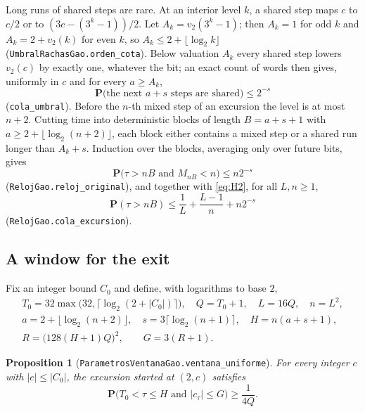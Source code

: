 \documentclass[11pt]{amsart}
\newtheorem{proposition}[theorem]{Proposition}
\theoremstyle{definition}
\theoremstyle{remark}
\newcommand{\Prob}{\mathbf{P}}
\newcommand{\lean}[1]{\nolinkurl{#1}}
\begin{document}
Long runs of shared steps are rare. At an interior level $k$, a shared step maps $c$ to $c/2$ or to $(3c-(3^k-1))/2$. Let $A_k=v_2(3^k-1)$; then $A_k=1$ for odd $k$ and $A_k=2+v_2(k)$ for even $k$, so $A_k\le 2+\lfloor\log_2 k\rfloor$ (\lean{UmbralRachasGao.orden_cota}). Below valuation $A_k$ every shared step lowers $v_2(c)$ by exactly one, whatever the bit; an exact count of words then gives, uniformly in $c$ and for every $a\ge A_k$,
\begin{equation}\label{eq:runs}
\Prob\bigl(\text{the next } a+s \text{ steps are shared}\bigr)\le 2^{-s}
\end{equation}
(\lean{cola_umbral}). Before the $n$-th mixed step of an excursion the level is at most $n+2$. Cutting time into deterministic blocks of length $B=a+s+1$ with $a\ge 2+\lfloor\log_2(n+2)\rfloor$, each block either contains a mixed step or a shared run longer than $A_k+s$. Induction over the blocks, averaging only over future bits, gives
\begin{equation}\label{eq:M6}
\Prob\bigl(\tau>nB \text{ and } M_{nB}<n\bigr)\le n2^{-s}
\end{equation}
(\lean{RelojGao.reloj_original}), and together with \eqref{eq:H2}, for all $L,n\ge1$,
\begin{equation}\label{eq:H3}
\Prob(\tau>nB)\le \frac1L+\frac{L-1}{n}+n2^{-s}
\end{equation}
(\lean{RelojGao.cola_excursion}).

\subsection{A window for the exit}
Fix an integer bound $C_0$ and define, with logarithms to base $2$,
\begin{gather*}
T_0=32\max\bigl(32,\lceil\log_2(2+|C_0|)\rceil\bigr),\quad Q=T_0+1,\quad L=16Q,\quad n=L^2,\\
a=2+\lfloor\log_2(n+2)\rfloor,\quad s=3\lceil\log_2(n+1)\rceil,\quad H=n(a+s+1),\\
R=\bigl(128(H+1)Q\bigr)^2,\qquad G=3(R+1).
\end{gather*}

\begin{proposition}[\lean{ParametrosVentanaGao.ventana_uniforme}]\label{prop:VH}
For every integer $c$ with $|c|\le|C_0|$, the excursion started at $(2,c)$ satisfies
\[
\Prob\bigl(T_0<\tau\le H \text{ and } |c_\tau|\le G\bigr)\ge\frac1{4Q}.
\]
\end{proposition}
\end{document}
